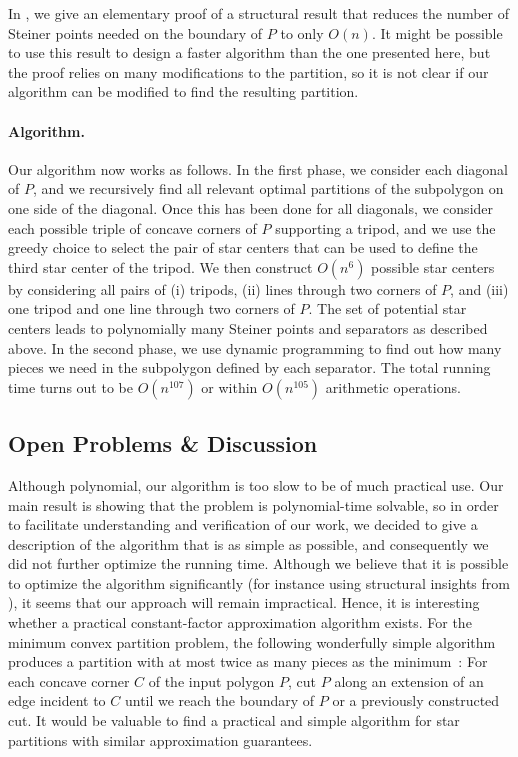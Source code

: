 \documentclass[10pt,a4paper]{article}
\begin{document}
In , we give an elementary proof of a structural result that reduces the number of Steiner points needed on the boundary of $P$ to only $O(n)$.
It might be possible to use this result to design a faster algorithm than the one presented here, but the proof relies on many modifications to the partition, so it is not clear if our algorithm can be modified to find the resulting partition.

\paragraph{Algorithm.}
Our algorithm now works as follows.
In the first phase, we consider each diagonal of $P$, and we recursively find all relevant optimal partitions of the subpolygon on one side of the diagonal.
Once this has been done for all diagonals, we consider each possible triple of concave corners of $P$ supporting a tripod, and we use the greedy choice to select the pair of star centers that can be used to define the third star center of the tripod.
We then construct $O(n^6)$ possible star centers by considering all pairs of (i) tripods, (ii) lines through two corners of $P$, and (iii) one tripod and one line through two corners of $P$.
The set of potential star centers leads to polynomially many Steiner points and separators as described above.
In the second phase, we use dynamic programming to find out how many pieces we need in the subpolygon defined by each separator. The total running time turns out to be $O(n^{107})$ or within $O(n^{105})$ arithmetic operations.

\subsection{Open Problems \& Discussion}

Although polynomial, our algorithm is too slow to be of much practical use.
Our main result is showing that the problem is polynomial-time solvable, so
in order to facilitate understanding and verification of our work, we decided to give a description of the algorithm that is as simple as possible, and consequently we did not further optimize the running time.
Although we believe that it is possible to optimize the algorithm significantly (for instance using structural insights from ), it seems that our approach will remain impractical.
Hence, it is interesting whether a practical constant-factor approximation algorithm exists.
For the minimum convex partition problem, the following wonderfully simple algorithm produces a partition with at most twice as many pieces as the minimum~\cite{chazelle1985approximation}:
For each concave corner $C$ of the input polygon $P$, cut $P$ along an extension of an edge incident to $C$ until we reach the boundary of $P$ or a previously constructed cut.
It would be valuable to find a practical and simple algorithm for star partitions with similar approximation guarantees.
\end{document}
